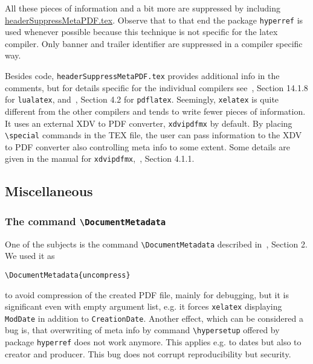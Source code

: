 \documentclass[a4paper, english]{article}%
\newcommand{\pdflatex}{\texttt{pdflatex}}
\newcommand{\lualatex}{\texttt{lualatex}}
\newcommand{\xelatex}{\texttt{xelatex}}
\newcommand{\cmd}[1]{\texttt{\textbackslash#1}}
\begin{document}
\begin{description}
\end{description}

All these pieces of information 
and a bit more are suppressed 
by including \href{\urlSite fromTex/headerSuppressMetaPDF.tex}{headerSuppressMetaPDF.tex}. 
Observe that to that end the package \texttt{hyperref} is used 
whenever possible because this technique is not specific for the latex compiler. 
Only banner and trailer identifier are suppressed in a compiler specific way. 

Besides code, \texttt{headerSuppressMetaPDF.tex} provides 
additional info in the comments, 
but for details specific for the individual compilers 
see~\cite{LuaTexRef24}, Section 14.1.8 for \lualatex, 
and~\cite{PdfTexUsr24}, Section 4.2 for \pdflatex. 
Seemingly, \xelatex{} is quite different from the other compilers 
and tends to write fewer pieces of information. 
It uses an external XDV to PDF converter, \texttt{xdvipdfmx} by default. 
By placing \cmd{special} commands in the TEX file, 
the user can pass information to the XDV to PDF converter 
also controlling meta info to some extent. 
Some details are given in the 
manual for \texttt{xdvipdfmx},~\cite{DviPdfMx}, Section 4.1.1. 



\subsection{Miscellaneous}\label{subsec:misc}

\subsubsection{The command \cmd{DocumentMetadata}}\label{subsubsec:docMeta}

One of the subjects is the command \cmd{DocumentMetadata} 
described in~\cite{DocMetaDataSuppCode}, Section 2. 
We used it as 
%
\begin{verbatim}
\DocumentMetadata{uncompress}
\end{verbatim}
%
to avoid compression of the created PDF file, mainly for debugging, 
but it is significant even with empty argument list, 
e.g. it forces \xelatex{} displaying \texttt{ModDate} in addition to \texttt{CreationDate}. 
Another effect, which can be considered a bug is, 
that overwriting of meta info by command \cmd{hypersetup} offered by package \texttt{hyperref} 
does not work anymore. 
This applies e.g. to dates but also to creator and producer. 
This bug does not corrupt reproducibility but security. 
\end{document}
